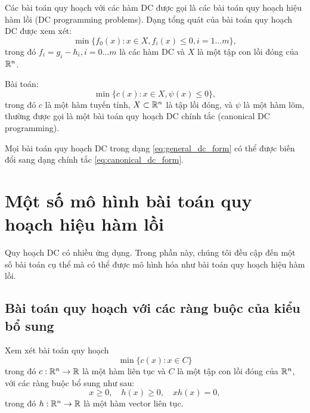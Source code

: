 \documentclass[a4paper]{report}
\begin{document}
    Các bài toán quy hoạch với các hàm DC được gọi là các bài toán quy hoạch hiệu hàm lồi (DC programming problems). Dạng tổng quát của bài toán quy hoạch DC được xem xét:
    \begin{equation}
        \label{eq:general_dc_form}
        \min\{f_0(x): x \in X, f_i(x) \leq 0, i = 1\dots m\},
    \end{equation}
    trong đó $f_i = g_i - h_i, i = 0\dots m$ là các hàm DC và $X$ là một tập con lồi đóng của $\mathbb{R}^n$. 

    Bài toán:
    \begin{equation}
        \label{eq:canonical_dc_form}
        \min\{c(x): x\in X, \psi(x) \leq 0\},
    \end{equation}
    trong đó $c$ là một hàm tuyến tính, $X \subset \mathbb{R}^n$ là tập lồi đóng, và $\psi$ là một hàm lõm, thường được gọi là một bài toán quy hoạch DC chính tắc (canonical DC programming). 
    
    Mọi bài toán quy hoạch DC trong dạng \ref{eq:general_dc_form} có thể được biến đổi sang dạng chính tắc \ref{eq:canonical_dc_form}.

    \chapter{Một số mô hình bài toán quy hoạch hiệu hàm lồi}
    \label{chap:some_dc_programming_problems}
    
    Quy hoạch DC có nhiều ứng dụng. Trong phần này, chúng tôi đều cập đến một số bài toán cụ thể mà có thể được mô hình hóa như bài toán quy hoạch hiệu hàm lồi.

    \section{Bài toán quy hoạch với các ràng buộc của kiểu bổ sung}

    Xem xét bài toán quy hoạch
    \begin{equation}
        \label{eq:programming}
        \min\{c(x): x \in C\}
    \end{equation}
    trong đó $c: \mathbb{R}^n \rightarrow \mathbb{R}$ là một hàm liên tục và $C$ là một tập con lồi đóng của $\mathbb{R}^n$, với các ràng buộc bổ sung như sau:
    \begin{equation}
        \label{eq:complementarity}
        x \geq 0,\quad h(x) \geq 0,\quad xh(x) = 0,
    \end{equation}
    trong đó $h: \mathbb{R}^n \rightarrow \mathbb{R}$ là một hàm vector liên tục.
\end{document}
